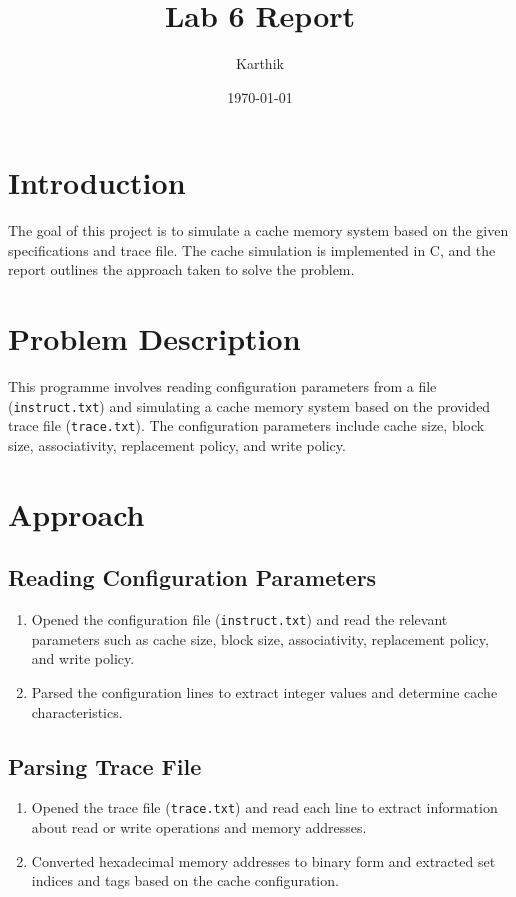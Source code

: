 \documentclass{article}
\title{Lab 6 Report}
\author{Karthik}
\date{\today}
\begin{document}
\maketitle


\section{Introduction}
The goal of this project is to simulate a cache memory system based on the given specifications and trace file. The cache simulation is implemented in C, and the report outlines the approach taken to solve the problem.

\section{Problem Description}
This programme involves reading configuration parameters from a file (\texttt{instruct.txt}) and simulating a cache memory system based on the provided trace file (\texttt{trace.txt}). The configuration parameters include cache size, block size, associativity, replacement policy, and write policy.

\section{Approach}

\subsection{Reading Configuration Parameters}
\begin{enumerate}
    \item Opened the configuration file (\texttt{instruct.txt}) and read the relevant parameters such as cache size, block size, associativity, replacement policy, and write policy.
    \item Parsed the configuration lines to extract integer values and determine cache characteristics.
\end{enumerate}

\subsection{Parsing Trace File}
\begin{enumerate}
    \item Opened the trace file (\texttt{trace.txt}) and read each line to extract information about read or write operations and memory addresses.
    \item Converted hexadecimal memory addresses to binary form and extracted set indices and tags based on the cache configuration.
\end{enumerate}
\end{document}
